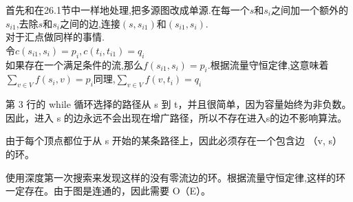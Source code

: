\documentclass[a4paper, justified]{tufte-handout}
\begin{document}
\begin{solution}
  首先和在26.1节中一样地处理,把多源图改成单源.在每一个$s$和$s_i$之间加一个额外的$s_{i1}$,去除$s$和$s_i$之间的边,连接$(s,s_{i1})$和$(s_{i1},s_i)$.\\
  对于汇点做同样的事情.\\
  令$c(s_{i1},s_i)=p_i,c(t_i,t_{i1})=q_i$\\
  如果存在一个满足条件的流,那么$f(s_{i1},s_i)=p_i$.根据流量守恒定律,这意味着$\sum_{v\in V}f(s_i,v)=p_i$同理,$\sum_{v\in V}f(v,t_i)=q_i$
\end{solution}

\begin{problem}[TC 26.2-8]
\end{problem}

\begin{solution}
\end{solution}

\begin{problem}[TC 26.2-10]
\end{problem}

\begin{solution}
  第 3 行的 while 循环选择的路径从 s 到 t，并且很简单，因为容量始终为非负数。因此，进入 s 的边永远不会出现在增广路径，所以不存在进入s的边不影响算法。
\end{solution}

\begin{problem}[TC 26.2-12]
\end{problem}

\begin{solution}
  由于每个顶点都位于从 s 开始的某条路径上，因此必须存在一个包含边 （v, s） 的环。
\end{solution}

\begin{problem}[TC 26.2-13]
\end{problem}

\begin{solution}
  使用深度第一次搜索来发现这样的没有零流边的环。根据流量守恒定律,这样的环一定存在。由于图是连通的，因此需要 O（E）。
\end{solution}

\begin{problem}[TC 26.3-3]
\end{problem}
\end{document}
